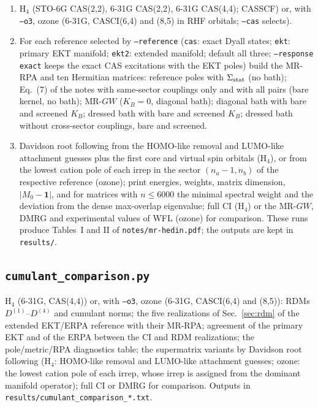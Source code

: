 \documentclass[11pt,a4paper]{article}
\newcommand{\code}[1]{\texttt{#1}}
\begin{document}
\begin{enumerate}[leftmargin=2em]
\item H$_4$ (STO-6G CAS(2,2), 6-31G CAS(2,2), 6-31G CAS(4,4); CASSCF) or,
  with \code{--o3}, ozone (6-31G, CASCI(6,4) and (8,5) in RHF orbitals;
  \code{--cas} selects).
\item For each reference selected by \code{--reference} (\code{cas}: exact
  Dyall states; \code{ekt}: primary EKT manifold; \code{ekt2}: extended
  manifold; default all three; \code{--response exact} keeps the exact CAS
  excitations with the EKT poles) build the MR-RPA and ten Hermitian
  matrices: reference poles with $\Sigma_{\rm stat}$ (no bath); Eq.~(7) of the
  notes with same-sector couplings only and with all pairs (bare kernel, no
  bath); MR-$GW$ ($K_B=0$, diagonal bath); diagonal bath with bare and
  screened $K_B$; dressed bath with bare and screened $K_B$; dressed bath
  without cross-sector couplings, bare and screened.
\item Davidson root following from the HOMO-like removal and LUMO-like
  attachment guesses plus the first core and virtual spin orbitals (H$_4$),
  or from the lowest cation pole of each irrep in the sector $(n_a-1,n_b)$
  of the respective reference (ozone); print energies, weights, matrix
  dimension, $|M_0-\mathbf 1|$, and for matrices with $n\le6000$ the minimal
  spectral weight and the deviation from the dense max-overlap eigenvalue;
  full CI (H$_4$) or the MR-$GW$, DMRG and experimental values of WFL
  (ozone) for comparison.  These runs produce Tables~I and II of
  \code{notes/mr-hedin.pdf}; the outputs are kept in \code{results/}.
\end{enumerate}

\subsection{\code{cumulant\_comparison.py}}

H$_4$ (6-31G, CAS(4,4)) or, with \code{--o3}, ozone (6-31G, CASCI(6,4) and
(8,5)): RDMs $D^{(1)}$--$D^{(4)}$ and cumulant norms; the five realizations of
Sec.~\ref{sec:rdm} of the extended EKT/ERPA reference with their MR-RPA;
agreement of the primary EKT and of the ERPA between the CI and RDM
realizations; the pole/metric/RPA diagnostics table; the supermatrix
variants by Davidson root following (H$_4$: HOMO-like removal and LUMO-like
attachment guesses; ozone: the lowest cation pole of each irrep, whose irrep
is assigned from the dominant manifold operator); full CI or DMRG for
comparison.  Outputs in \code{results/cumulant\_comparison\_*.txt}.
\end{document}

